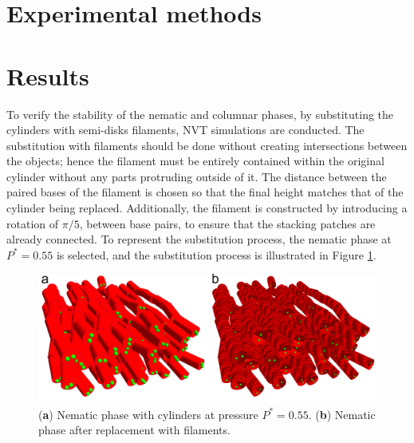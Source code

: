 \documentclass[aip,jcp, amsmath, amssymb, reprint]{revtex4-1}
\begin{document}
\section{\label{exp}Experimental methods}




\section{\label{Results}Results}
To verify the stability of the nematic and columnar phases, by substituting the cylinders with semi-disks filaments, NVT simulations are conducted. The substitution with filaments should be done without creating intersections between the objects; hence the filament must be entirely contained within the original cylinder without any parts protruding outside of it. The distance between the paired bases of the filament is chosen so that the final height matches that of the cylinder being replaced. Additionally, the filament is constructed by introducing a rotation of $\pi/5$, between base pairs, to ensure that the stacking patches are already connected. To represent the substitution process, the nematic phase at $P^*=0.55$ is selected, and the substitution process is illustrated in Figure \ref{sosti1}.

\begin{figure}[h!]
\includegraphics[width=0.9\linewidth]{sosti1.png} 
\caption{\label{sosti1} (\textbf{a}) Nematic phase with cylinders at pressure $P^*=0.55$. (\textbf{b}) Nematic phase after replacement with filaments. } 
\end{figure} 
\end{document}
